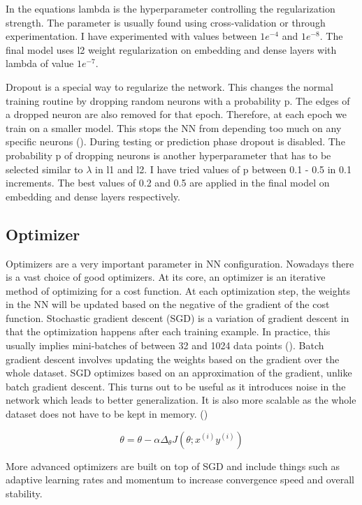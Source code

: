 In the equations lambda is the hyperparameter controlling the regularization strength. The parameter is usually found using cross-validation or through experimentation. I have experimented with values between \(1e^{-4}\) and \(1e^{-8}\). The final model uses l2 weight regularization on embedding and dense layers with lambda of value \(1e^{-7}\).

Dropout is a special way to regularize the network. This changes the normal training routine by dropping random neurons with a probability p. The edges of a dropped neuron are also removed for that epoch. Therefore, at each epoch we train on a smaller model.
This stops the NN from depending too much on any specific neurons (\citet{dropout}). During testing or prediction phase dropout is disabled. The probability p of dropping neurons is another hyperparameter that has to be selected similar to $\lambda$ in l1 and l2. I have tried values of p between 0.1 - 0.5 in 0.1 increments. The best values of 0.2 and 0.5 are applied in the final model on embedding and dense layers respectively.

\subsection{Optimizer}
Optimizers are a very important parameter in NN configuration. Nowadays there is a vast choice of good optimizers. At its core, an optimizer is an iterative method of optimizing for a cost function. At each optimization step, the weights in the NN will be updated based on the negative of the gradient of the cost function. Stochastic gradient descent (SGD) is a variation of gradient descent in that the optimization happens after each training example. In practice, this usually implies mini-batches of between 32 and 1024 data points (\citet{practical_training}). Batch gradient descent involves updating the weights based on the gradient over the whole dataset. SGD optimizes based on an approximation of the gradient, unlike batch gradient descent. This turns out to be useful as it introduces noise in the network which leads to better generalization. It is also more scalable as the whole dataset does not have to be kept in memory. (\citet{practical_training})

\begin{equation}
    \theta = \theta - \alpha \Delta_{\theta} J(\theta ;x^{(i)}y^{(i)})
\end{equation}

More advanced optimizers are built on top of SGD and include things such as adaptive learning rates and momentum to increase convergence speed and overall stability.

